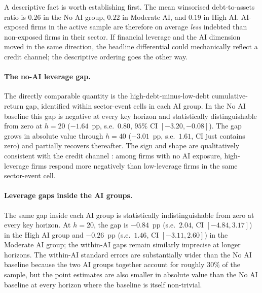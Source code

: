 A descriptive fact is worth establishing first. The mean winsorised
debt-to-assets ratio is $0.26$ in the No AI group, $0.22$ in
Moderate AI, and $0.19$ in High AI. AI-exposed firms in the active
sample are therefore on average \emph{less} indebted than non-exposed
firms in their sector. If financial leverage and the AI dimension
moved in the same direction, the headline differential could
mechanically reflect a credit channel; the descriptive ordering goes
the other way.
 
\paragraph{The no-AI leverage gap.} The directly comparable quantity
is the high-debt-minus-low-debt cumulative-return gap, identified
within sector-event cells in each AI group. In the No AI baseline
this gap is negative at every key horizon and statistically
distinguishable from zero at $h = 20$ ($-1.64$~pp, s.e.~$0.80$,
$95\%$ CI $[-3.20, -0.08]$). The gap grows in absolute value through
$h = 40$ ($-3.01$~pp, s.e.~$1.61$, CI just contains zero) and
partially recovers thereafter. The sign and shape are qualitatively
consistent with the credit channel \citep{ottonelloWinberry2020}:
among firms with no AI exposure, high-leverage firms respond more
negatively than low-leverage firms in the same sector-event cell.
 
\paragraph{Leverage gaps inside the AI groups.} The same gap inside
each AI group is statistically indistinguishable from zero at every
key horizon. At $h = 20$, the gap is $-0.84$~pp (s.e.~$2.04$,
CI $[-4.84, 3.17]$) in the High AI group and $-0.26$~pp
(s.e.~$1.46$, CI $[-3.11, 2.60]$) in the Moderate AI group; the
within-AI gaps remain similarly imprecise at longer horizons. The
within-AI standard errors are substantially wider than the No AI
baseline because the two AI groups together account for roughly
$30\%$ of the sample, but the point estimates are also smaller in
absolute value than the No AI baseline at every horizon where the
baseline is itself non-trivial.
 
